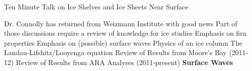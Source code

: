 \documentclass{beamer}
\begin{document}
\begin{frame}{Ten Minute Talk on Ice Shelves and Ice Sheets Near Surface}
\begin{outline}[enumerate]
\1 Dr. Connolly has returned from Weizmann Institute with good news
\1 Part of those discussions require a review of knowledge for ice studies
\2 Emphasis on firn properties
\2 Emphasis on (possible) surface waves
\1 Physics of an ice column
\1 The Landau-Lifshitz/Looyenga equation
\1 Review of Results from Moore's Bay (2011-12)
\1 Review of Results from ARA Analyses (2011-present)
\1 \textbf{Surface Waves}
\end{outline}
\end{frame}
\end{document}
